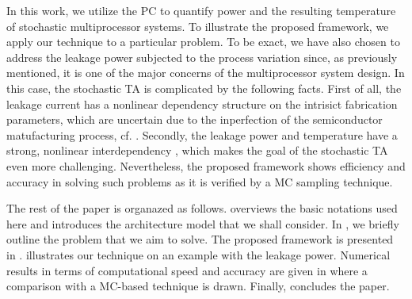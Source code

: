 In this work, we utilize the PC to quantify power and the resulting temperature of stochastic multiprocessor systems. To illustrate the proposed framework, we apply our technique to a particular problem. To be exact, we have also chosen to address the leakage power subjected to the process variation since, as previously mentioned, it is one of the major concerns of the multiprocessor system design. In this case, the stochastic TA is complicated by the following facts. First of all, the leakage current has a nonlinear dependency structure on the intrisict fabrication parameters, which are uncertain due to the inperfection of the semiconductor matufacturing process, cf. \cite{juan2011, juan2012, srivastava2010}. Secondly, the leakage power and temperature have a strong, nonlinear interdependency \cite{liu2007}, which makes the goal of the stochastic TA even more challenging. Nevertheless, the proposed framework shows efficiency and accuracy in solving such problems as it is verified by a MC sampling technique.

The rest of the paper is organazed as follows.  overviews the basic notations used here and introduces the architecture model that we shall consider. In , we briefly outline the problem that we aim to solve. The proposed framework is presented in .  illustrates our technique on an example with the leakage power. Numerical results in terms of computational speed and accuracy are given in  where a comparison with a MC-based technique is drawn. Finally,  concludes the paper.
